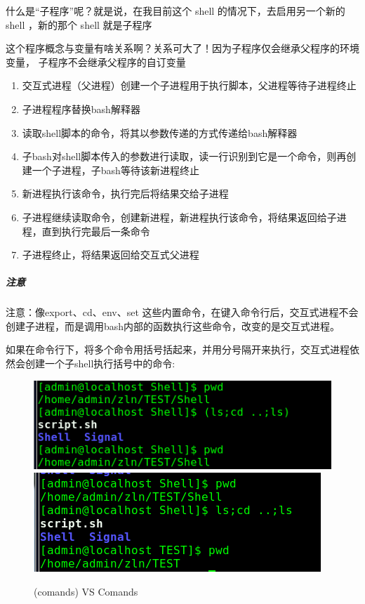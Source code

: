 \documentclass[UTF8,a4paper,12pt]{ctexbook}
\begin{document}
				 什么是“子程序”呢？就是说，在我目前这个 shell 的情况下，去启用另一个新的 shell ，新的那个 shell 就是子程序
				 
				 这个程序概念与变量有啥关系啊？关系可大了！因为子程序仅会继承父程序的环境变量， 子程序不会继承父程序的自订变量
				 \begin{enumerate}
				 	\item 交互式进程（父进程）创建一个子进程用于执行脚本，父进程等待子进程终止
				 	\item 子进程程序替换bash解释器
				 	\item 读取shell脚本的命令，将其以参数传递的方式传递给bash解释器
				 	\item 子bash对shell脚本传入的参数进行读取，读一行识别到它是一个命令，则再创建一个子进程，子bash等待该新进程终止
				 	\item 新进程执行该命令，执行完后将结果交给子进程
				 	\item 子进程继续读取命令，创建新进程，新进程执行该命令，将结果返回给子进程，直到执行完最后一条命令
				 	\item 子进程终止，将结果返回给交互式父进程
				 \end{enumerate}
				 
				 \subparagraph{注意}注意：像export、cd、env、set 这些内置命令，在键入命令行后，交互式进程不会创建子进程，而是调用bash内部的函数执行这些命令，改变的是交互式进程。
				 
				 如果在命令行下，将多个命令用括号括起来，并用分号隔开来执行，交互式进程依然会创建一个子shell执行括号中的命令:
					 \begin{figure}[h]
					 	\begin{center}
						 	\includegraphics[scale = 0.5]{figure/ShellBracket.png}
						 	\includegraphics[scale = 0.5]{figure/ShellBracketNo.png}
						\end{center}
					 	\caption{(comands) VS Comands}
					 \end{figure}
				 
\end{document}
